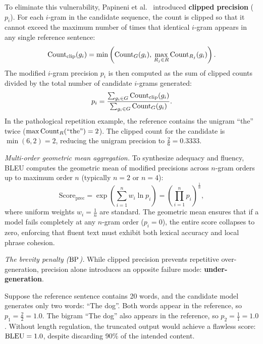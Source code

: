 \documentclass[../../main.tex]{subfiles}
\begin{document}
To eliminate this vulnerability, Papineni et al.~\cite{papineni2002bleu} introduced \textbf{clipped precision} ($p_i$). For each $i$-gram in the candidate sequence, the count is clipped so that it cannot exceed the maximum number of times that identical $i$-gram appears in any single reference sentence:
\begin{equation}
\label{eq:clipped_ngram_count}
\operatorname{Count}_{\text{clip}}(g_i) = \min\left( \operatorname{Count}_G(g_i), \, \max_{R_j \in R} \operatorname{Count}_{R_j}(g_i) \right).
\end{equation}
The modified $i$-gram precision $p_i$ is then computed as the sum of clipped counts divided by the total number of candidate $i$-grams generated:
\begin{equation}
\label{eq:bleu_modified_precision}
p_i = \frac{\sum_{g_i \in G} \operatorname{Count}_{\text{clip}}(g_i)}{\sum_{g_i \in G} \operatorname{Count}_G(g_i)}.
\end{equation}
In the pathological repetition example, the reference contains the unigram ``the'' twice ($\max \operatorname{Count}_R(\text{``the''}) = 2$). The clipped count for the candidate is $\min(6, 2) = 2$, reducing the unigram precision to $\frac{2}{6} = 0.3333$.

\textit{Multi-order geometric mean aggregation.} To synthesize adequacy and fluency, BLEU computes the geometric mean of modified precisions across $n$-gram orders up to maximum order $n$ (typically $n=2$ or $n=4$):
\begin{equation}
\label{eq:bleu_precision_geom_mean}
\text{Score}_{\text{prec}} = \exp\left( \sum_{i=1}^n w_i \ln p_i \right) = \left( \prod_{i=1}^n p_i \right)^{\frac{1}{n}},
\end{equation}
where uniform weights $w_i = \frac{1}{n}$ are standard. The geometric mean ensures that if a model fails completely at any $n$-gram order ($p_i = 0$), the entire score collapses to zero, enforcing that fluent text must exhibit both lexical accuracy and local phrase cohesion.

\textit{The brevity penalty ($\mathrm{BP}$).} While clipped precision prevents repetitive over-generation, precision alone introduces an opposite failure mode: \textbf{under-generation}. 

Suppose the reference sentence contains 20 words, and the candidate model generates only two words: ``The dog''. Both words appear in the reference, so $p_1 = \frac{2}{2} = 1.0$. The bigram ``The dog'' also appears in the reference, so $p_2 = \frac{1}{1} = 1.0$. Without length regulation, the truncated output would achieve a flawless score: $\mathrm{BLEU} = 1.0$, despite discarding 90\% of the intended content.
\end{document}
